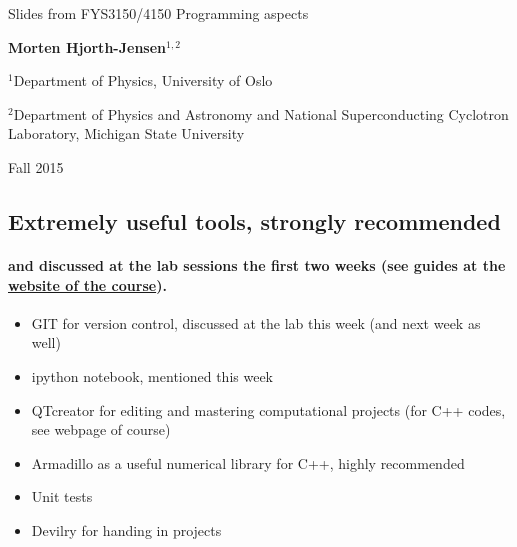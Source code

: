 \documentclass[%
oneside,                 %
final,                   %
10pt]{article}
\begin{document}






\thispagestyle{empty}

\begin{center}
{\LARGE\bf
\begin{spacing}{1.25}
Slides from FYS3150/4150 Programming aspects
\end{spacing}
}
\end{center}


\begin{center}
{\bf Morten Hjorth-Jensen${}^{1, 2}$} \\ [0mm]
\end{center}

\begin{center}
\centerline{{\small ${}^1$Department of Physics, University of Oslo}}
\centerline{{\small ${}^2$Department of Physics and Astronomy and National Superconducting Cyclotron Laboratory, Michigan State University}}
\end{center}
    

\begin{center} %
Fall 2015
\end{center}

\vspace{1cm}


\subsection*{Extremely useful tools, strongly recommended}


\paragraph{and discussed at the lab sessions the first two weeks (see guides at the \href{{http://www.uio.no/studier/emner/matnat/fys/FYS3150/h15/index.html}}{website of the course}).}
\begin{itemize}
  \item GIT for version control, discussed at the lab this week (and next week as well)

  \item ipython notebook, mentioned this week 

  \item QTcreator for editing and mastering computational projects (for C++ codes, see webpage of course)

  \item Armadillo as a useful numerical library for C++, highly recommended

  \item Unit tests

  \item Devilry for handing in projects
\end{itemize}
\end{document}
